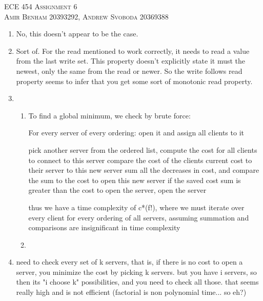 \documentclass{article}
\begin{document}
\begin{center}
\textsc{\Large ECE 454 Assignment 6}\\[0.5cm]
\textsc{Amir Benham 20393292, Andrew Svoboda 20369388}\\[0.5cm]
\end{center}

\begin{enumerate}

	\item  

No, this doesn't appear to be the case.

	\item  

Sort of. For the read mentioned to work correctly, it needs to read a value from the last write set. This property doesn't explicitly state it must the newest, only the same from the read or newer. So the write follows read property seems to infer that you get some sort of monotonic read property. 

	\item  

	\begin{enumerate}

		\item 

To find a global minimum, we check by brute force:

For every server of every ordering:
	open it and assign all clients to it
	
	pick another server from the ordered list, 
		compute the cost for all clients to connect to this server
		compare the cost of the clients current cost to their server to this new server
		sum all the decreases in cost, and compare the sum to the cost to open this new server
		if the saved cost sum is greater than the cost to open the server, open the server

thus we have a time complexity of c*(f!), where we must iterate over every client for every ordering of all servers, assuming summation and comparisons are insignificant in time complexity

		\item



	\end{enumerate}

	\item  

need to check every set of k servers, that is, if there is no cost to open a server, you minimize the cost by picking k servers. but you have i servers, so then its "i choose k" possibilities, and you need to check all those. that seems really high and is not efficient (factorial is non polynomial time... so eh?)


\end{enumerate}
\end{document}
